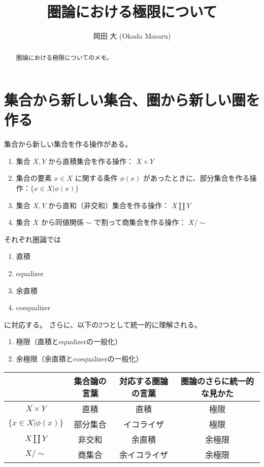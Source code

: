 \documentclass[uplatex,a4j,12pt,dvipdfmx]{jsarticle}
\title{
圏論における極限について
}
\author{
岡田 大 (Okada Masaru)
}
\begin{document}
\maketitle


\begin{abstract}
圏論における極限についてのメモ。
\end{abstract}

\section{集合から新しい集合、圏から新しい圏を作る}

集合から新しい集合を作る操作がある。

\begin{enumerate}
    \item 集合 $X,Y$ から直積集合を作る操作： $X \times Y$
    \item 集合の要素 $x \in X$ に関する条件 $\phi(x)$ があったときに、部分集合を作る操作：$\{ x \in X | \phi(x) \}$
    \item 集合 $X,Y$ から直和（非交和）集合を作る操作： $X \coprod Y$
    \item 集合 $X$ から同値関係 $\sim$ で割って商集合を作る操作： $X / \sim$
\end{enumerate}

それぞれ圏論では

\begin{enumerate}
    \item 直積 
    \item equalizer
    \item 余直積
    \item coequalizer
\end{enumerate}

に対応する。
さらに、以下の2つとして統一的に理解される。

\begin{enumerate}
    \item 極限（直積とequalizerの一般化）
    \item 余極限（余直積とcoequalizerの一般化）
\end{enumerate}


\begin{table}[H]
    \centering
    \begin{tabular}{c|c|c|c}
    & 集合論の言葉 & 対応する圏論の言葉 & 圏論のさらに統一的な見かた \\ \hline \hline
    $X \times Y$ & 直積 & 直積 & 極限 \\ \hline
    $\{ x \in X | \phi(x) \}$ & 部分集合 & イコライザ & 極限 \\ \hline
    $X \coprod Y$& 非交和 & 余直積 & 余極限 \\ \hline
    $X / \sim$ & 商集合 & 余イコライザ & 余極限 \\ \hline
    \end{tabular}
\end{table}
\end{document}
